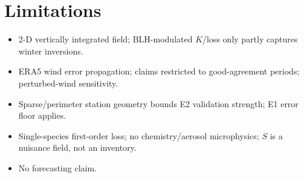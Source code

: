 \section{Limitations}
\begin{itemize}
  \item 2-D vertically integrated field; BLH-modulated $K$/loss only partly captures winter inversions.
  \item ERA5 wind error propagation; claims restricted to good-agreement periods; perturbed-wind sensitivity.
  \item Sparse/perimeter station geometry bounds E2 validation strength; E1 error floor applies.
  \item Single-species first-order loss; no chemistry/aerosol microphysics; $S$ is a nuisance field, not an inventory.
  \item No forecasting claim.
\end{itemize}
